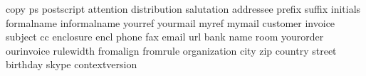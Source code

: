               {copy}
                {ps}
        {postscript}
         {attention}
      {distribution}
        {salutation}
         {addressee}
            {prefix}
            {suffix}
          {initials}
        {formalname}
      {informalname}
           {yourref}
          {yourmail}
             {myref}
            {mymail}
          {customer}
           {invoice}
           {subject}
                {cc}
         {enclosure}
              {encl}
             {phone}
               {fax}
             {email}
               {url}
              {bank}
              {name}
              {room}
         {yourorder}
        {ourinvoice}
         {rulewidth}
         {fromalign}
          {fromrule}
      {organization}
              {city}
               {zip}
           {country}
            {street}
          {birthday}
             {skype}
    {contextversion}
\stopinterface

